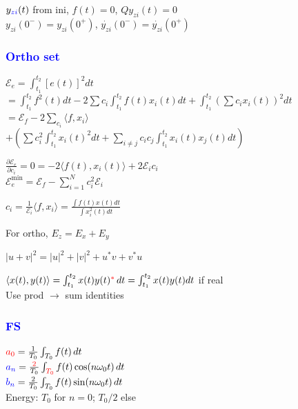 \documentclass[4pt]{article}
\theoremstyle{definition}
\theoremstyle{definition}
\renewcommand{\o}{\omega}
\newcommand{\ra}{\rightarrow}
\newcommand{\red}[1]{\textcolor{red}{#1}}
\newcommand{\blue}[1]{\textcolor{blue}{#1}}
\begin{document}
\begin{landscape}
\begin{multicols}{3}
        $y_{\blue{zi}}(t)$ from ini, $f(t)=0$,
            $Q y_{zi}(t) = 0$\\
            $y_{zi}(0^-) = y_{zi}(0^+)$, $\dot{y_{zi}}(0^-) = \dot{y_{zi}}(0^+)$
\subsubsection*{\blue{Ortho set}}
    $\mathcal{E}_e = \int_{t_1}^{t_2} [e(t)]^2 dt$\\
        $= \int_{t_1}^{t_2} f^2(t)dt - 2\sum c_i \int_{t_1}^{t_2} f(t) x_i(t) dt + \int_{t_1}^{t_2} (\sum c_i x_i(t))^2 dt$\\
        \hspace{1em}$= \mathcal{E}_f -  2\sum_{c_i} \langle f, x_i \rangle$\\
            \hspace{2em}$+(\sum c_i^2 \int_{t_1}^{t_2} x_i(t)^2 dt + \sum_{i\neq j} c_i c_j \int_{t_1}^{t_2} x_i(t) x_j(t) dt)$
        
    $\frac{\partial \mathcal{E}_e}{\partial c_i} = 0 = -2 \langle f(t), x_i(t)\rangle + 2\mathcal{E}_i c_i$\\
    $\mathcal{E}_e^{\text{min}} = \mathcal{E}_f - \sum_{i=1}^N c_i^2 \mathcal{E}_i$

    \(c_i = \frac{1}{\mathcal{E}_i}\langle f, x_i\rangle = \frac{\int f(t) x(t) dt}{\int x_i^2(t) dt}\)    

    For ortho, $E_z = E_x + E_y$
        

    $|u+v|^2 = |u|^2 + |v|^2 + u^*v + v^*u$

    $\langle x(t), y(t)\rangle = \int_{t_1}^{t_2} x(t) y(t)^{\red *} \, dt = \int_{t_1}^{t_2} x(t) y(t) dt$ if real\\
    Use prod $\ra$ sum identities
\newpage
\subsubsection*{\blue{FS}}
    $\red{a_0} = \frac{1}{T_0} \int_{T_0} f(t)\, dt$\\
    $\blue{a_n} = \frac{\red 2}{T_0} \int_{\red{T_0}} f(t) \cos(n\o_0t)\,dt$\\
    $\blue{b_n} = \frac{2}{T_0} \int_{T_0} f(t) \sin(n\o_0t)\,dt$\\
    Energy: $T_0$ for $n=0$; $T_0/2$ else
     

\end{multicols}
\end{landscape}
\end{document}
